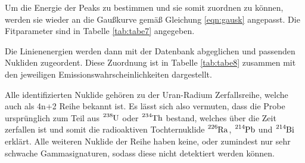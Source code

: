 Um die Energie der Peaks zu bestimmen und sie somit zuordnen zu können, werden sie
wieder an die Gaußkurve gemäß Gleichung \ref{eqn:gausk} angepasst. Die Fitparameter sind in Tabelle
\ref{tab:tabe7} angegeben.

\newpage
Die Linienenergien werden dann mit der Datenbank \cite{lara} abgeglichen und
passenden Nukliden zugeordent.
Diese Zuordnung ist in Tabelle \ref{tab:tabe8} zusammen mit den jeweiligen Emissionswahrscheinlichkeiten
dargestellt.

Alle identifizierten Nuklide gehören zu der Uran-Radium Zerfallsreihe, welche auch als 4n+2
Reihe bekannt ist. Es lässt sich also vermuten, dass die Probe ursprünglich zum Teil aus
$\ce{^{238}U}$ oder $\ce{^{234}Th}$ bestand, welches über  die Zeit zerfallen ist und somit die
radioaktiven Tochternuklide $\ce{^{226}Ra}$, $\ce{^{214}Pb}$ und $\ce{^{214}Bi}$ erklärt.
Alle weiteren Nuklide der Reihe haben keine, oder zumindest nur sehr schwache
Gammasignaturen, sodass diese nicht detektiert werden können.
